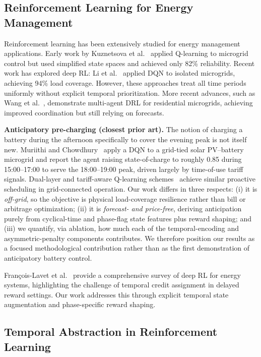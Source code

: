 \documentclass[11pt,a4paper]{article}
\begin{document}
\subsection{Reinforcement Learning for Energy Management}

Reinforcement learning has been extensively studied for energy management applications. Early work by Kuznetsova et al.~\cite{kuznetsova2013} applied Q-learning to microgrid control but used simplified state spaces and achieved only 82\% reliability. Recent work has explored deep RL: Li et al.~\cite{li2020} applied DQN to isolated microgrids, achieving 94\% load coverage. However, these approaches treat all time periods uniformly without explicit temporal prioritization. More recent advances, such as Wang et al.~\cite{zhang2024multi}, demonstrate multi-agent DRL for residential microgrids, achieving improved coordination but still relying on forecasts.

\textbf{Anticipatory pre-charging (closest prior art).} The notion of charging a battery during the afternoon specifically to cover the evening peak is not itself new. Muriithi and Chowdhury~\cite{muriithi2022} apply a DQN to a grid-tied solar PV--battery microgrid and report the agent raising state-of-charge to roughly 0.85 during 15:00--17:00 to serve the 18:00--19:00 peak, driven largely by time-of-use tariff signals. Dual-layer and tariff-aware Q-learning schemes~\cite{dualq2023} achieve similar proactive scheduling in grid-connected operation. Our work differs in three respects: (i) it is \emph{off-grid}, so the objective is physical load-coverage resilience rather than bill or arbitrage optimization; (ii) it is \emph{forecast- and price-free}, deriving anticipation purely from cyclical-time and phase-flag state features plus reward shaping; and (iii) we quantify, via ablation, how much each of the temporal-encoding and asymmetric-penalty components contributes. We therefore position our results as a focused methodological contribution rather than as the first demonstration of anticipatory battery control.

François-Lavet et al.~\cite{fran2018} provide a comprehensive survey of deep RL for energy systems, highlighting the challenge of temporal credit assignment in delayed reward settings. Our work addresses this through explicit temporal state augmentation and phase-specific reward shaping.

\subsection{Temporal Abstraction in Reinforcement Learning}
\end{document}

